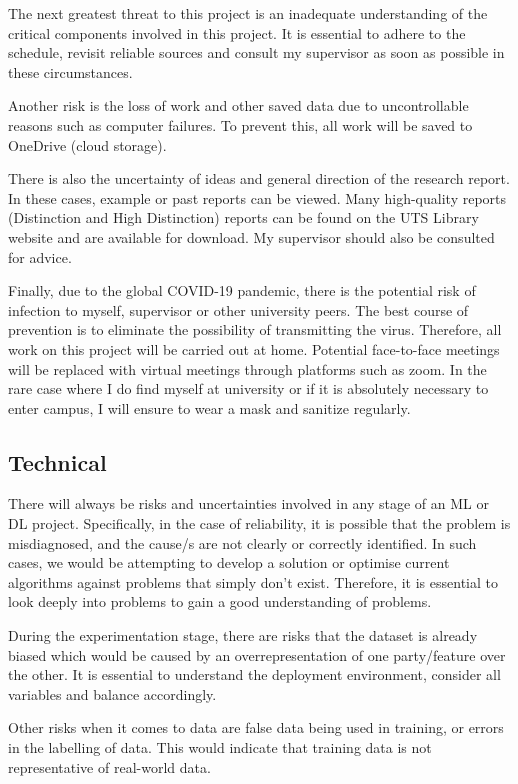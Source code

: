 \documentclass[a4paper,12pt]{report}
\begin{document}
The next greatest threat to this project is an inadequate understanding of the critical components involved in this project. 
It is essential to adhere to the schedule, revisit reliable sources and consult my supervisor as soon as possible in these circumstances. 

Another risk is the loss of work and other saved data due to uncontrollable reasons such as computer failures. 
To prevent this, all work will be saved to OneDrive (cloud storage). 

There is also the uncertainty of ideas and general direction of the research report. 
In these cases, example or past reports can be viewed. Many high-quality reports (Distinction and High Distinction) reports can be found on the UTS Library website and are available for download. 
My supervisor should also be consulted for advice. 

Finally, due to the global COVID-19 pandemic, there is the potential risk of infection to myself, supervisor or other university peers. 
The best course of prevention is to eliminate the possibility of transmitting the virus. Therefore, all work on this project will be carried out at home. 
Potential face-to-face meetings will be replaced with virtual meetings through platforms such as zoom. 
In the rare case where I do find myself at university or if it is absolutely necessary to enter campus, I will ensure to wear a mask and sanitize regularly.

\subsection{Technical}
There will always be risks and uncertainties involved in any stage of an ML or DL project. 
Specifically, in the case of reliability, it is possible that the problem is misdiagnosed, and the cause/s are not clearly or correctly identified. 
In such cases, we would be attempting to develop a solution or optimise current algorithms against problems that simply don’t exist. 
Therefore, it is essential to look deeply into problems to gain a good understanding of problems. 

During the experimentation stage, there are risks that the dataset is already biased which would be caused by an overrepresentation of one party/feature over the other. 
It is essential to understand the deployment environment, consider all variables and balance accordingly. \cite{sires} 

Other risks when it comes to data are false data being used in training, or errors in the labelling of data. 
This would indicate that training data is not representative of real-world data. 
\end{document}
